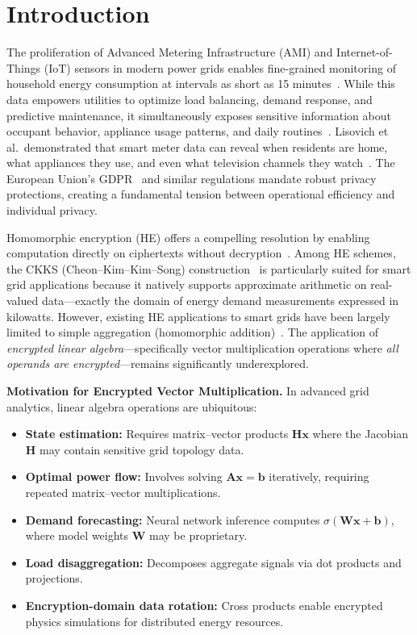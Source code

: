 \documentclass[conference,12pt]{IEEEtran}
\begin{document}
\section{Introduction}
\label{sec:introduction}

The proliferation of Advanced Metering Infrastructure (AMI) and Internet-of-Things (IoT) sensors in modern power grids enables fine-grained monitoring of household energy consumption at intervals as short as 15 minutes~\cite{McDaniel2009}. While this data empowers utilities to optimize load balancing, demand response, and predictive maintenance, it simultaneously exposes sensitive information about occupant behavior, appliance usage patterns, and daily routines~\cite{Molina2010}. Lisovich et al.\ demonstrated that smart meter data can reveal when residents are home, what appliances they use, and even what television channels they watch~\cite{Lisovich2010}. The European Union's GDPR~\cite{Voigt2017} and similar regulations mandate robust privacy protections, creating a fundamental tension between operational efficiency and individual privacy.

Homomorphic encryption (HE) offers a compelling resolution by enabling computation directly on ciphertexts without decryption~\cite{Gentry2009}. Among HE schemes, the CKKS (Cheon--Kim--Kim--Song) construction~\cite{Cheon2017} is particularly suited for smart grid applications because it natively supports approximate arithmetic on real-valued data---exactly the domain of energy demand measurements expressed in kilowatts. However, existing HE applications to smart grids have been largely limited to simple aggregation (homomorphic addition)~\cite{Li2010, Garcia2011, Erkin2012}. The application of \emph{encrypted linear algebra}---specifically vector multiplication operations where \emph{all operands are encrypted}---remains significantly underexplored.

\textbf{Motivation for Encrypted Vector Multiplication.} In advanced grid analytics, linear algebra operations are ubiquitous:
\begin{itemize}
    \item \textbf{State estimation:} Requires matrix--vector products $\mathbf{H}\mathbf{x}$ where the Jacobian $\mathbf{H}$ may contain sensitive grid topology data.
    \item \textbf{Optimal power flow:} Involves solving $\mathbf{A}\mathbf{x} = \mathbf{b}$ iteratively, requiring repeated matrix--vector multiplications.
    \item \textbf{Demand forecasting:} Neural network inference computes $\sigma(\mathbf{W}\mathbf{x} + \mathbf{b})$, where model weights $\mathbf{W}$ may be proprietary.
    \item \textbf{Load disaggregation:} Decomposes aggregate signals via dot products and projections.
    \item \textbf{Encryption-domain data rotation:} Cross products enable encrypted physics simulations for distributed energy resources.
\end{itemize}
\end{document}
